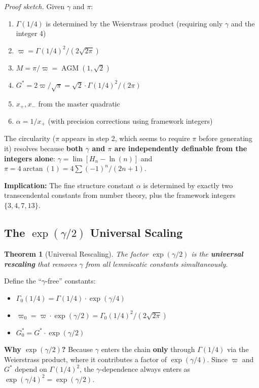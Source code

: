 \documentclass[11pt, letterpaper]{article}
\newcommand{\G}{G^*}
\DeclareMathOperator{\AGM}{AGM}
\newtheorem{theorem}{Theorem}[section]
\theoremstyle{definition}
\theoremstyle{remark}
\begin{document}
\textit{Proof sketch.} Given $\gamma$ and $\pi$:
\begin{enumerate}[noitemsep]
    \item $\Gamma(1/4)$ is determined by the Weierstrass product (requiring only $\gamma$ and the integer 4)
    \item $\varpi = \Gamma(1/4)^2/(2\sqrt{2\pi})$
    \item $M = \pi/\varpi = \AGM(1,\sqrt{2})$
    \item $\G = 2\varpi/\sqrt{\pi} = \sqrt{2}\cdot\Gamma(1/4)^2/(2\pi)$
    \item $x_+, x_-$ from the master quadratic
    \item $\alpha = 1/x_+$ (with precision corrections using framework integers)
\end{enumerate}

The circularity ($\pi$ appears in step 2, which seems to require $\pi$ before generating it) resolves because \textbf{both $\gamma$ and $\pi$ are independently definable from the integers alone}: $\gamma = \lim[H_n - \ln(n)]$ and $\pi = 4\arctan(1) = 4\sum(-1)^n/(2n+1)$.

\textbf{Implication:} The fine structure constant $\alpha$ is determined by exactly two transcendental constants from number theory, plus the framework integers $\{3, 4, 7, 13\}$.

\subsection{The $\exp(\gamma/2)$ Universal Scaling}

\begin{theorem}[Universal Rescaling]
The factor $\exp(\gamma/2)$ is the \textbf{universal rescaling} that removes $\gamma$ from all lemniscatic constants simultaneously.
\end{theorem}

Define the ``$\gamma$-free'' constants:
\begin{itemize}[noitemsep]
    \item $\Gamma_0(1/4) = \Gamma(1/4) \cdot \exp(\gamma/4)$
    \item $\varpi_0 = \varpi \cdot \exp(\gamma/2) = \Gamma_0(1/4)^2/(2\sqrt{2\pi})$
    \item $\G_0 = \G \cdot \exp(\gamma/2)$
\end{itemize}

\textbf{Why $\exp(\gamma/2)$?} Because $\gamma$ enters the chain \textbf{only} through $\Gamma(1/4)$ via the Weierstrass product, where it contributes a factor of $\exp(\gamma/4)$. Since $\varpi$ and $\G$ depend on $\Gamma(1/4)^2$, the $\gamma$-dependence always enters as $\exp(\gamma/4)^2 = \exp(\gamma/2)$.
\end{document}
